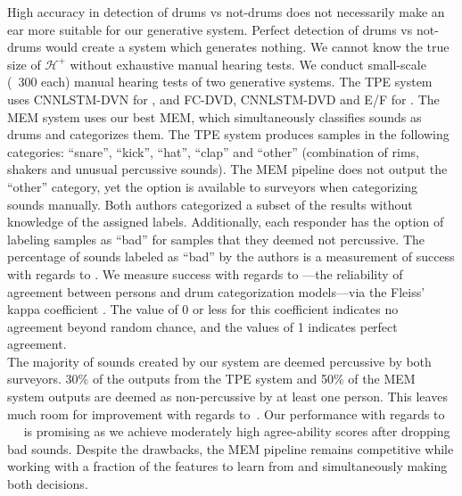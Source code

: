 \documentclass[runningheads,a4paper]{llncs}
\begin{document}
High accuracy in detection of drums vs not-drums does not necessarily make an ear more suitable for our generative system. Perfect detection of drums vs not-drums would create a system which generates nothing.  We cannot know the true size of $\mathcal{H^{+}}$ without exhaustive manual hearing tests. We conduct small-scale (~300 each) manual hearing tests of two generative systems. The TPE system uses CNNLSTM-DVN for \descfirst, and FC-DVD, CNNLSTM-DVD and E/F for \descsecond. The MEM system uses our best MEM, which simultaneously classifies sounds as drums and categorizes them. 
The TPE system produces samples in the following categories: \enquote{snare}, \enquote{kick}, \enquote{hat}, \enquote{clap} and \enquote{other} (combination of rims, shakers and unusual percussive sounds). The MEM pipeline does not output the \enquote{other} category, yet the option is available to surveyors when categorizing sounds manually.   
Both authors categorized a subset of the results without knowledge of the assigned labels. Additionally, each responder has the option of labeling samples as \enquote{bad} for samples that they deemed not percussive.  The percentage of sounds labeled as \enquote{bad} by the authors is a measurement of success with regards to \descfirst. We measure success with regards to \descsecond---the reliability of agreement between persons and drum categorization models---via the Fleiss' kappa coefficient \cite{fleiss1971measuring}. The value of 0 or less for this coefficient indicates no agreement beyond random chance, and the values of 1 indicates perfect agreement. \\
The majority of sounds created by our system are deemed percussive by both surveyors. 30\% of the outputs from the TPE system and 50\% of the MEM system outputs are deemed as non-percussive by at least one person. This leaves much room for improvement with regards to~\descfirst. Our performance with regards to ~\descsecond~ is promising as we achieve moderately high agree-ability scores after dropping bad sounds. Despite the drawbacks, the MEM pipeline remains competitive while working with a fraction of
the features to learn from and simultaneously making both decisions. 
\end{document}
